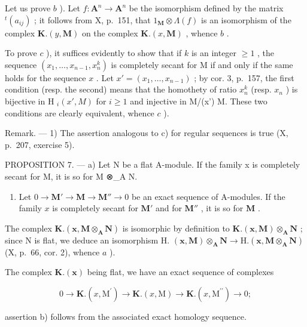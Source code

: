 Let us prove \(b\) ). Let \(f: \mathbf{A}^n \to \mathbf{A}^n\) be the isomorphism defined by the matrix \(^t(a_{ij})\) ; it follows from X, p.~151, that \(1_{\mathbf{M}} \otimes \Lambda(f)\) is an isomorphism of the complex \(\mathbf{K}.(y, \mathbf{M})\) on the complex \(\mathbf{K}.(x, \mathbf{M})\) , whence \(b\) .

To prove \(c\) ), it suffices evidently to show that if \(k\) is an integer \(\geqslant 1\) , the sequence \((x_{1}, \ldots, x_{n-1}, x_{n}^{k})\) is completely secant for M if and only if the same holds for the sequence \(x\) . Let \(x' = (x_{1}, \ldots, x_{n-1})\) ; by cor. 3, p.~157, the first condition (resp. the second) means that the homothety of ratio \(x_{n}^{k}\) (resp. \(x_{n}\) ) is bijective in H \(_{i}(x', M)\) for \(i \geqslant 1\) and injective in M/(x') M. These two conditions are clearly equivalent, whence \(c\) ).

Remark. --- 1) The assertion analogous to c) for regular sequences is true (X, p.~207, exercise 5).

PROPOSITION 7. --- a) Let N be a flat A-module. If the family x is completely secant for M, it is so for M ⊗\_A N.

\begin{enumerate}
\def\labelenumi{\alph{enumi})}
\setcounter{enumi}{1}
\tightlist
\item
  Let \(0 \to \mathbf{M}' \to \mathbf{M} \to \mathbf{M}'' \to 0\) be an exact sequence of A-modules. If the family \(x\) is completely secant for \(\mathbf{M}'\) and for \(\mathbf{M}''\) , it is so for \(\mathbf{M}\) .
\end{enumerate}

The complex \(\mathbf{K}.\left(\mathbf{x},\mathbf{M}\otimes_{\mathbf{A}}\mathbf{N}\right)\) is isomorphic by definition to \(\mathbf{K}.\left(\mathbf{x},\mathbf{M}\right)\otimes_{\mathbf{A}}\mathbf{N}\) ; since N is flat, we deduce an isomorphism H. \((\mathbf{x},\mathbf{M})\otimes_{\mathbf{A}}\mathbf{N}\to\mathrm{H}.\left(\mathbf{x},\mathbf{M}\otimes_{\mathbf{A}}\mathbf{N}\right)\) (X, p.~66, cor. 2), whence \(a\) ).

The complex \(\mathbf{K}.\left(\mathbf{x}\right)\) being flat, we have an exact sequence of complexes

\[
0 \rightarrow \mathbf {K}. (x, \mathrm{M} ^ {\prime}) \rightarrow \mathbf {K}. (x, \mathrm{M}) \rightarrow \mathbf {K}. (x, \mathrm{M} ^ {\prime \prime}) \rightarrow 0;
\]

assertion b) follows from the associated exact homology sequence.

